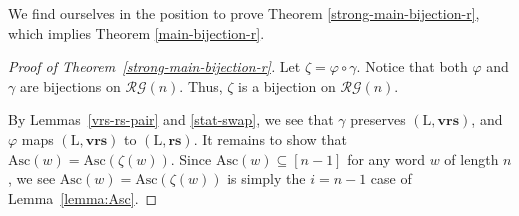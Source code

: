 \documentclass[12pt]{amsart}
\numberwithin{equation}{section}
\theoremstyle{plain}
\theoremstyle{definition}
\def\Asc{\mathrm{Asc}}
\def\LL{\mathrm{L}}
\def\brs{\mathbf{rs}}
\def\bwrs{\mathbf{vrs}}
\def\RG{\mathcal{RG}}
\begin{document}
We find ourselves in the position to prove Theorem \ref{strong-main-bijection-r}, which implies Theorem \ref{main-bijection-r}.
\begin{proof}[Proof of Theorem~\ref{strong-main-bijection-r}]
Let $\zeta=\varphi  \circ  \gamma$. Notice that both $\varphi$ and $\gamma$ are bijections on $\RG(n)$. Thus, $\zeta$ is a bijection on
$\RG(n)$.

By Lemmas~\ref{vrs-rs-pair} and \ref{stat-swap}, we see that $\gamma$ preserves $(\LL,\bwrs)$, and $\varphi$ maps $(\LL, \bwrs)$ to $(\LL, \brs)$. It remains to show that $\Asc(w)=\Asc(\zeta(w))$. Since $\Asc(w)\subseteq [n-1]$ for any word $w$ of length $n$, we see $\Asc(w)=\Asc(\zeta(w))$ is simply the $i=n-1$ case of Lemma~\ref{lemma:Asc}.


\end{proof}
\end{document}

